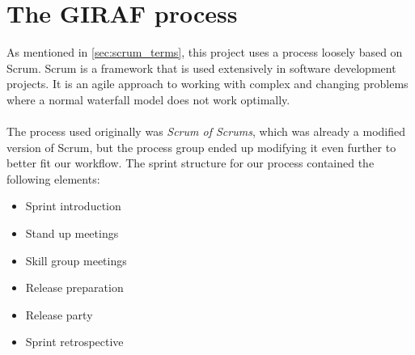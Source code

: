 \section{The GIRAF process}\label{the-giraf-process}
As mentioned in \autoref{sec:scrum_terms}, this project uses a process loosely based on Scrum. Scrum is a framework that is used extensively in software development projects.
It is an agile approach to working with complex and changing problems where a normal waterfall model does not work optimally.
\\\\
The process used originally was \textit{Scrum of Scrums}, which was already a modified version of Scrum, but the process group ended up modifying it even further to better fit our workflow.
The sprint structure for our process contained the following elements:

\begin{itemize}
    \item Sprint introduction
    \item Stand up meetings
    \item Skill group meetings
    \item Release preparation
    \item Release party
    \item Sprint retrospective
\end{itemize}

